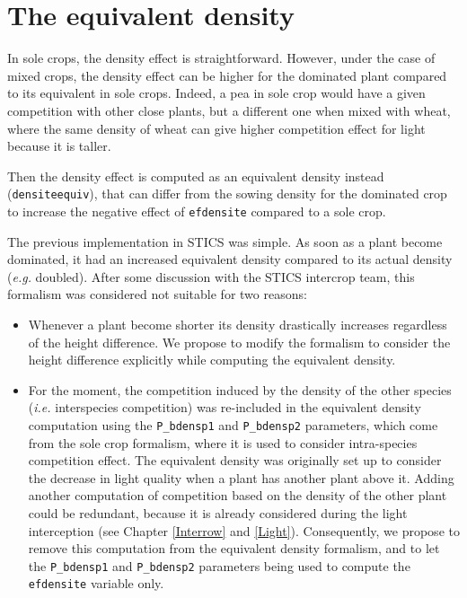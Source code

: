 \documentclass[]{book}
\begin{document}
\hypertarget{the-equivalent-density}{%
\section{The equivalent density}\label{the-equivalent-density}}

In sole crops, the density effect is straightforward. However, under the case of mixed crops, the density effect can be higher for the dominated plant compared to its equivalent in sole crops. Indeed, a pea in sole crop would have a given competition with other close plants, but a different one when mixed with wheat, where the same density of wheat can give higher competition effect for light because it is taller.

Then the density effect is computed as an equivalent density instead (\texttt{densiteequiv}), that can differ from the sowing density for the dominated crop to increase the negative effect of \texttt{efdensite} compared to a sole crop.

The previous implementation in STICS was simple. As soon as a plant become dominated, it had an increased equivalent density compared to its actual density (\emph{e.g.} doubled). After some discussion with the STICS intercrop team, this formalism was considered not suitable for two reasons:

\begin{itemize}
\item
  Whenever a plant become shorter its density drastically increases regardless of the height difference. We propose to modify the formalism to consider the height difference explicitly while computing the equivalent density.
\item
  For the moment, the competition induced by the density of the other species (\emph{i.e.} interspecies competition) was re-included in the equivalent density computation using the \texttt{P\_bdensp1} and \texttt{P\_bdensp2} parameters, which come from the sole crop formalism, where it is used to consider intra-species competition effect. The equivalent density was originally set up to consider the decrease in light quality when a plant has another plant above it. Adding another computation of competition based on the density of the other plant could be redundant, because it is already considered during the light interception (see Chapter \ref{Interrow} and \ref{Light}). Consequently, we propose to remove this computation from the equivalent density formalism, and to let the \texttt{P\_bdensp1} and \texttt{P\_bdensp2} parameters being used to compute the \texttt{efdensite} variable only.
\end{itemize}
\end{document}
